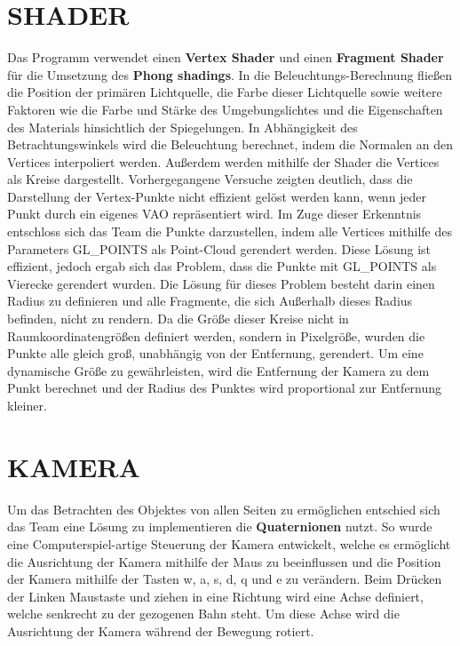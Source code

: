 	\section{\Large SHADER}
	Das Programm verwendet einen \textbf{Vertex Shader} und einen \textbf{Fragment Shader} für die Umsetzung des \textbf{Phong shadings}. In die Beleuchtungs-Berechnung fließen die Position der primären Lichtquelle, die Farbe dieser Lichtquelle sowie weitere Faktoren wie die Farbe und Stärke des Umgebungslichtes und die Eigenschaften des Materials hinsichtlich der Spiegelungen. In Abhängigkeit des Betrachtungswinkels wird die Beleuchtung berechnet, indem die Normalen an den Vertices interpoliert werden. Außerdem werden mithilfe der Shader die Vertices als Kreise dargestellt.\newline\newline
 	Vorhergegangene Versuche zeigten deutlich, dass die Darstellung der Vertex-Punkte nicht effizient gelöst werden kann, wenn jeder Punkt durch ein eigenes VAO repräsentiert wird. Im Zuge dieser Erkenntnis entschloss sich das Team die Punkte darzustellen, indem alle Vertices mithilfe des Parameters GL\_POINTS als Point-Cloud gerendert werden. Diese Lösung ist effizient, jedoch ergab sich das Problem, dass die Punkte mit GL\_POINTS als Vierecke gerendert wurden. Die Lösung für dieses Problem besteht darin einen Radius zu definieren und alle Fragmente, die sich Außerhalb dieses Radius befinden, nicht zu rendern. Da die Größe dieser Kreise nicht in Raumkoordinatengrößen definiert werden, sondern in Pixelgröße, wurden die Punkte alle gleich groß, unabhängig von der Entfernung, gerendert. Um eine dynamische Größe zu gewährleisten, wird die Entfernung der Kamera zu dem Punkt berechnet und der Radius des Punktes wird proportional zur Entfernung kleiner.
	
	\section{\Large KAMERA}
	Um das Betrachten des Objektes von allen Seiten zu ermöglichen entschied sich das Team eine Lösung zu implementieren die \textbf{Quaternionen} nutzt. So wurde eine Computerspiel-artige Steuerung der Kamera entwickelt, welche es ermöglicht die Ausrichtung der Kamera mithilfe der Maus zu beeinflussen und die Position der Kamera mithilfe der Tasten w, a, s, d, q und e zu verändern. Beim Drücken der Linken Maustaste und ziehen in eine Richtung wird eine Achse definiert, welche senkrecht zu der gezogenen Bahn steht. Um diese Achse wird die Ausrichtung der Kamera während der Bewegung rotiert.
		
